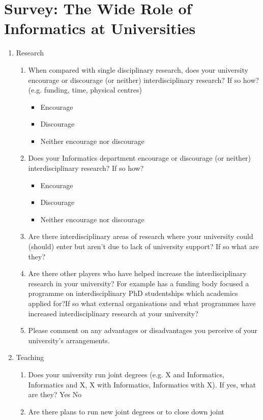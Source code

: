 \newpage
\appendix
\section{Survey: The Wide Role of Informatics at Universities}\label{appendix}
\begin{enumerate}
\item Research
\begin{enumerate}
\item When compared with single disciplinary research, does your
university encourage or discourage (or neither) interdisciplinary
research? If so how? (e.g. funding, time, physical centres)
\begin{itemize}
\item Encourage
\item Discourage
\item Neither encourage nor discourage
\end{itemize}
\item Does your Informatics department encourage or discourage (or
neither) interdisciplinary research? If so how?
\begin{itemize}
\item Encourage
\item Discourage
\item Neither encourage nor discourage
\end{itemize}
\item Are there interdisciplinary areas of research where your university
could (should) enter but aren't due to lack of university support? If so
what are they?
\item Are there other players who have helped increase the
interdisciplinary research in your university?
For example has a funding body focused a programme on
interdisciplinary PhD studentships which academics applied for?If so
what external organisations and what programmes have increased
interdisciplinary research at your university?
\item Please comment on any advantages or disadvantages you perceive
of your university's arrangements.
\end{enumerate}
\item Teaching
\begin{enumerate}
\item Does your university run joint degrees (e.g. X and Informatics, Informatics and X, X with Informatics, Informatics with X). If yes,
what are they?
Yes
No
\item Are there plans to run new joint degrees or to close down joint

\end{enumerate}
\end{enumerate}
